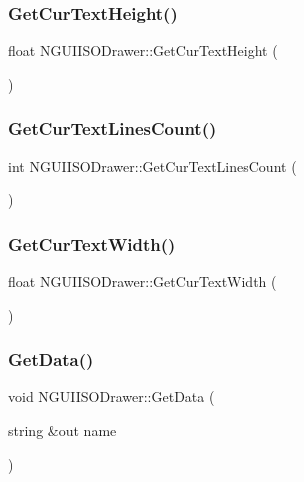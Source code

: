 \subsubsection{\texorpdfstring{Get\+Cur\+Text\+Height()}{GetCurTextHeight()}}
{\footnotesize\ttfamily float N\+G\+U\+I\+I\+S\+O\+Drawer\+::\+Get\+Cur\+Text\+Height (\begin{DoxyParamCaption}{ }\end{DoxyParamCaption})}

\hypertarget{class_n_g_u_i_i_s_o_drawer_a13a9c88b39e6fde486b50f210a0a6275}{}\label{class_n_g_u_i_i_s_o_drawer_a13a9c88b39e6fde486b50f210a0a6275} 
\subsubsection{\texorpdfstring{Get\+Cur\+Text\+Lines\+Count()}{GetCurTextLinesCount()}}
{\footnotesize\ttfamily int N\+G\+U\+I\+I\+S\+O\+Drawer\+::\+Get\+Cur\+Text\+Lines\+Count (\begin{DoxyParamCaption}{ }\end{DoxyParamCaption})}

\hypertarget{class_n_g_u_i_i_s_o_drawer_a335a6cea9e6f9ff845bb6aa2450dba17}{}\label{class_n_g_u_i_i_s_o_drawer_a335a6cea9e6f9ff845bb6aa2450dba17} 
\subsubsection{\texorpdfstring{Get\+Cur\+Text\+Width()}{GetCurTextWidth()}}
{\footnotesize\ttfamily float N\+G\+U\+I\+I\+S\+O\+Drawer\+::\+Get\+Cur\+Text\+Width (\begin{DoxyParamCaption}{ }\end{DoxyParamCaption})}

\hypertarget{class_n_g_u_i_i_s_o_drawer_a7c916a027b1880fba87cfb161b95c3f3}{}\label{class_n_g_u_i_i_s_o_drawer_a7c916a027b1880fba87cfb161b95c3f3} 
\subsubsection{\texorpdfstring{Get\+Data()}{GetData()}}
{\footnotesize\ttfamily void N\+G\+U\+I\+I\+S\+O\+Drawer\+::\+Get\+Data (\begin{DoxyParamCaption}\item[{string \&out}]{name }\end{DoxyParamCaption})}

